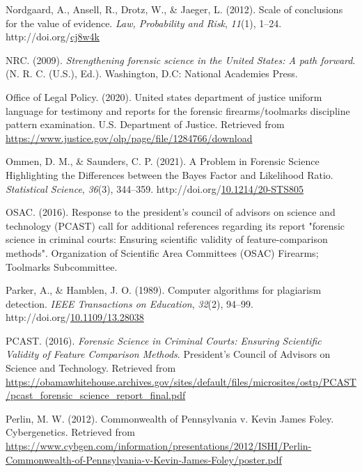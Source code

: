 \documentclass[print]{nuthesis}
\newlength{\cslhangindent}
\newenvironment{CSLReferences}[2]%
{\setlength{\parindent}{0pt}%
\everypar{\setlength{\hangindent}{\cslhangindent}}\ignorespaces}%
{\par}
\begin{document}
\begin{CSLReferences}{1}{0}
\leavevmode{}%
Nordgaard, A., Ansell, R., Drotz, W., \& Jaeger, L. (2012). Scale of conclusions for the value of evidence. \emph{Law, Probability and Risk}, \emph{11}(1), 1--24. http://doi.org/\href{https://doi.org/cj8w4k}{cj8w4k}

\leavevmode{}%
NRC. (2009). \emph{Strengthening forensic science in the {United} {States}: A path forward}. (N. R. C. (U.S.), Ed.). Washington, D.C: National Academies Press.

\leavevmode{}%
Office of Legal Policy. (2020). United states department of justice uniform language for testimony and reports for the forensic firearms/toolmarks discipline pattern examination. U.S. Department of Justice. Retrieved from \url{https://www.justice.gov/olp/page/file/1284766/download}

\leavevmode{}%
Ommen, D. M., \& Saunders, C. P. (2021). A {Problem} in {Forensic} {Science} {Highlighting} the {Differences} between the {Bayes} {Factor} and {Likelihood} {Ratio}. \emph{Statistical Science}, \emph{36}(3), 344--359. http://doi.org/\href{https://doi.org/10.1214/20-STS805}{10.1214/20-STS805}

\leavevmode{}%
OSAC. (2016). Response to the president's council of advisors on science and technology (PCAST) call for additional references regarding its report "forensic science in criminal courts: Ensuring scientific validity of feature-comparison methods". Organization of Scientific Area Committees (OSAC) Firearms; Toolmarks Subcommittee.

\leavevmode{}%
Parker, A., \& Hamblen, J. O. (1989). Computer algorithms for plagiarism detection. \emph{IEEE Transactions on Education}, \emph{32}(2), 94--99. http://doi.org/\href{https://doi.org/10.1109/13.28038}{10.1109/13.28038}

\leavevmode{}%
PCAST. (2016). \emph{Forensic {Science} in {Criminal} {Courts}: {Ensuring} {Scientific} {Validity} of {Feature} {Comparison} {Methods}}. {President's Council of Advisors on Science and Technology}. Retrieved from \url{https://obamawhitehouse.archives.gov/sites/default/files/microsites/ostp/PCAST/pcast_forensic_science_report_final.pdf}

\leavevmode{}%
Perlin, M. W. (2012). Commonwealth of {Pennsylvania} v. {Kevin James Foley}. Cybergenetics. Retrieved from \url{https://www.cybgen.com/information/presentations/2012/ISHI/Perlin-Commonwealth-of-Pennsylvania-v-Kevin-James-Foley/poster.pdf}


\end{CSLReferences}
\end{document}
